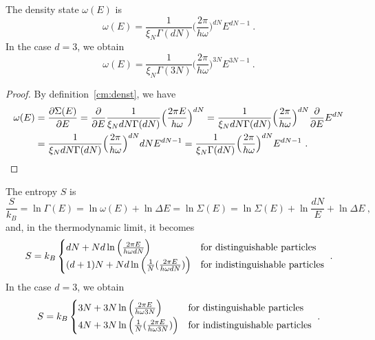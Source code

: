     The density state $\omega(E)$ is
    \begin{equation}\label{harmosc}
        \omega (E) = \frac{1}{\xi_N \Gamma (dN)} \Big (\frac{2 \pi}{h \omega} \Big )^{dN} E^{dN-1} ~.
    \end{equation}
    In the case $d = 3$, we obtain 
    \begin{equation*}
        \omega (E) = \frac{1}{\xi_N \Gamma (3N)} \Big (\frac{2 \pi}{h \omega} \Big )^{3N} E^{3N-1} ~.
    \end{equation*}
    \begin{proof}
        By definition~\eqref{cm:denst}, we have
        \begin{equation*}
        \begin{aligned}
            \omega (E) & = \frac{\partial\Sigma (E)}{\partial E} = \frac{\partial}{\partial E} \frac{1}{\xi_N dN \Gamma (dN)} \Big (\frac{2 \pi E}{h \omega} \Big )^{dN} = \frac{1}{\xi_N dN \Gamma (dN)} \Big (\frac{2 \pi}{h \omega} \Big )^{dN} \frac{\partial}{\partial E} E^{dN} \\ & = \frac{1}{\xi_N dN \Gamma (dN)} \Big (\frac{2 \pi}{h \omega} \Big )^{dN} dN E^{dN-1} = \frac{1}{\xi_N \Gamma (dN)} \Big (\frac{2 \pi}{h \omega} \Big )^{dN} E^{dN-1} ~.
        \end{aligned}
        \end{equation*}
    \end{proof}
    The entropy $S$ is
    \begin{equation*}
        \frac{S}{k_B} = \ln \Gamma(E) = \ln \omega(E) + \ln \Delta E = \ln \Sigma(E) = \ln \Sigma(E) + \ln \frac{dN}{E} + \ln \Delta E ~,
    \end{equation*}
    and, in the thermodynamic limit, it becomes
    \begin{equation*}
        S = k_B \begin{cases}
            d N + N d \ln \Big (\frac{2 \pi E }{h \omega d N} \Big) & \textnormal{for distinguishable particles} \\
            (d+1) N + N d \ln \Big ( \frac{1}{N} (\frac{2 \pi E }{h \omega d N} ) \Big ) & \textnormal{for indistinguishable particles} \\
        \end{cases} ~.
    \end{equation*}
    In the case $d = 3$, we obtain 
    \begin{equation*}
        S = k_B \begin{cases}
            3 N + 3 N \ln \Big (\frac{2 \pi E }{h \omega 3 N} \Big)  & \textnormal{for distinguishable particles} \\
            4 N + 3 N \ln \Big ( \frac{1}{N} (\frac{2 \pi E }{h \omega 3 N} ) \Big ) & \textnormal{for indistinguishable particles} \\
        \end{cases} ~.
    \end{equation*}
